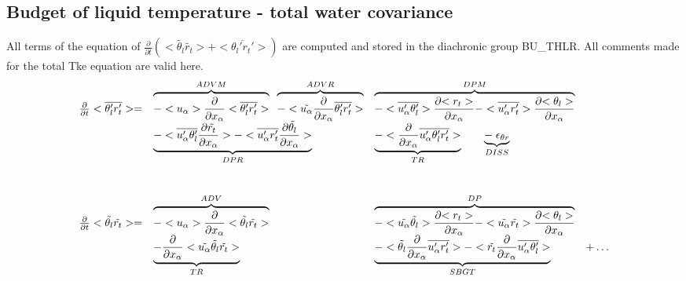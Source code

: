 \subsection{Budget of liquid temperature - total water covariance}


All terms of the equation of $\frac{\partial}{\partial t} (<\tilde{\theta_l}\tilde{r_t}> + <\overline{\theta_l'r_t'}>)$ are
computed and stored in the diachronic group BU\_THLR. 
All comments made for the total Tke equation are valid here.\\

\begin{displaymath}
\left.
\begin{array}{rllll}
\frac{\partial }{\partial t} <\overline{\theta_l'r_t'}> = & 
\overbrace{- <u_\alpha>\frac{\partial}{\partial x_\alpha} <\overline{\theta_l'r_t'}> }^{ADVM} \;\;
\overbrace{- <\tilde{u_\alpha}\frac{\partial}{\partial x_\alpha} \overline{\theta_l'r_t'} > }^{ADVR} &
\overbrace{- <\overline{u_\alpha'\theta_l'}> \frac{\partial {<r_t>}}{\partial x_\alpha}
- <\overline{u'_\alpha r_t'}> \frac{\partial {<\theta_l>}}{\partial x_\alpha}}^{DPM} \\
\vspace*{1.0cm}
& \underbrace{- <\overline{u'_\alpha \theta_l'} \frac{\partial {\tilde{r_t}}}{\partial x_\alpha}>
- <\overline{u'_\alpha r_t'} \frac{\partial {\tilde{\theta_l}}}{\partial x_\alpha}>}_{DPR} 
 & \underbrace{- <\frac{\partial}{\partial x_\alpha} \overline{u'_\alpha \theta_l'r_t'}>}_{TR} \;\;\;\;\;\;\;
 \underbrace{-\; \epsilon_{\theta r}}_{DISS}\\
 \frac{\partial }{\partial t} <\tilde{\theta_l}\tilde{r_t}> = & 
\overbrace{- <u_\alpha>\frac{\partial}{\partial x_\alpha} <\tilde{\theta_l}\tilde{r_t}> }^{ADV} &
\overbrace{- <\tilde{u_\alpha} \tilde{\theta_l}> \frac{\partial {<r_t>}}{\partial x_\alpha}
- <\tilde{u_\alpha} \tilde{r_t}> \frac{\partial {<\theta_l>}}{\partial x_\alpha}}^{DP} &\\
 & \underbrace{- \frac{\partial}{\partial x_\alpha} <\tilde{u_\alpha} \tilde{\theta_l}\tilde{r_t}>}_{TR} &
\underbrace{- <\tilde{\theta_l}\frac{\partial}{\partial x_\alpha}\overline{u'_\alpha r_t'}>
- <\tilde{r_t}\frac{\partial}{\partial x_\alpha}\overline{u'_\alpha \theta_l'}>}_{SBGT} & + \ldots
\end{array}
\right.
\end{displaymath}

